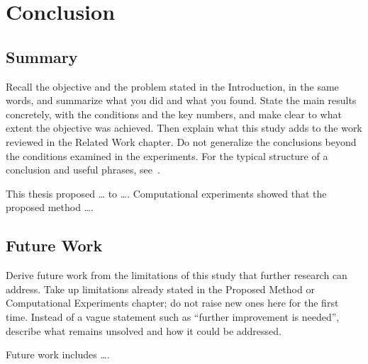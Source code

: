 \chapter{Conclusion}
\label{chap:conclusion}

\section{Summary}
\label{sec:summary}

\begin{writingnote}
Recall the objective and the problem stated in the Introduction, in the same words, and summarize what you did and what you found.
State the main results concretely, with the conditions and the key numbers, and make clear to what extent the objective was achieved.
Then explain what this study adds to the work reviewed in the Related Work chapter.
Do not generalize the conclusions beyond the conditions examined in the experiments.
For the typical structure of a conclusion and useful phrases, see~\cite{glasmandeal2010science,morleyphrasebank}.
\end{writingnote}

This thesis proposed \ldots{} to \ldots.
Computational experiments showed that the proposed method \ldots.

\section{Future Work}
\label{sec:future-work}

\begin{writingnote}
Derive future work from the limitations of this study that further research can address.
Take up limitations already stated in the Proposed Method or Computational Experiments chapter; do not raise new ones here for the first time.
Instead of a vague statement such as ``further improvement is needed'', describe what remains unsolved and how it could be addressed.
\end{writingnote}

Future work includes \ldots.
